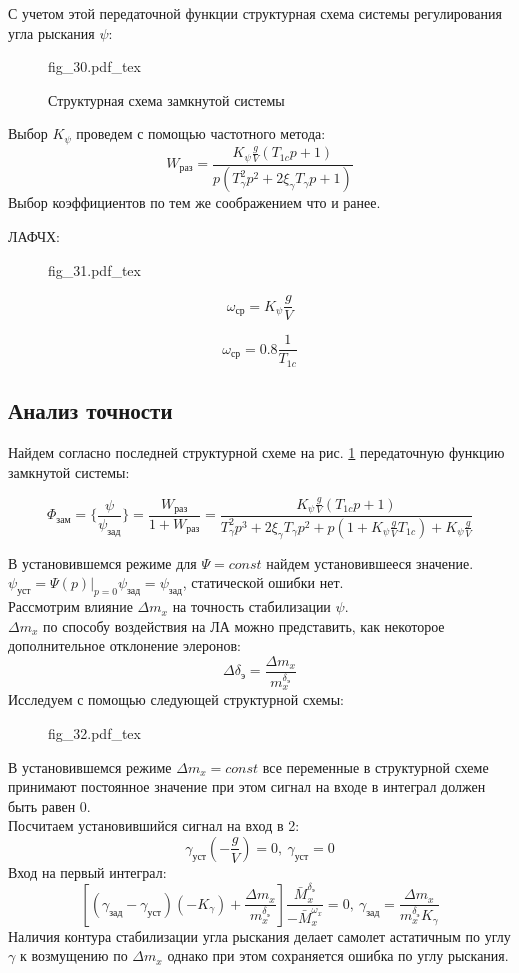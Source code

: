 \documentclass{article}
\begin{document}
С учетом этой передаточной функции структурная схема системы регулирования угла
рыскания $\psi$:

\begin{figure}[h]
    \centering
    {fig_30.pdf_tex}
    \caption{Структурная схема замкнутой системы}
    \label{fig:zam30}
\end{figure}

Выбор $K_{\psi}$ проведем с помощью частотного метода:
\[
    W_\text{раз} = \frac{K_{\psi} \frac{g}{V} (T_{1c}p + 1)}{p(T_{\gamma}^2 p^2
    + 2 \xi_\gamma T_\gamma p + 1)}
\]
Выбор коэффициентов по тем же соображением что и ранее.


ЛАФЧХ:
\begin{figure}[H]
    \centering
    {fig_31.pdf_tex}
\end{figure}

\[
    \omega_\text{ср} = K_{\psi}\frac{g}{V}
\]

\[
    \omega_\text{ср} = 0.8\frac{1}{T_{1c}}
\]

\subsection{Анализ точности}
Найдем согласно последней структурной схеме на рис. \ref{fig:zam30}
передаточную функцию замкнутой системы:

\[
    \Phi_\text{зам} = \{\frac{\psi}{\psi_\text{зад}} \} = \frac{W_\text{раз}}{1
    + W_\text{раз}} = \frac{K_{\psi}\frac{g}{V}(T_{1c}p + 1)}{T_{\gamma}^2 p^3
+ 2\xi_\gamma T_\gamma p^2 + p(1 + K_{\psi}\frac{g}{V} T_{1c}) +
K_{\psi}\frac{g}{V}}
\]

В установившемся режиме для $\Psi = const$ найдем установившееся значение.\\
$\psi_\text{уст} = \Psi(p) |_{p=0}  \psi _\text{зад}= \psi_\text{зад}$,
статической ошибки нет.\\
Рассмотрим влияние $\Delta m_x$ на точность стабилизации $\psi$.\\
$\Delta m_x$ по способу воздействия на ЛА можно представить, как некоторое
дополнительное отклонение элеронов:
\[
    \Delta \delta_\text{э} =\frac{\Delta m_x}{m_x^{\delta_\text{э}}}
\]
Исследуем с помощью следующей структурной схемы:
\begin{figure}[H]
    \centering
    {fig_32.pdf_tex}
\end{figure}


В установившемся режиме $\Delta m_x = const$ все переменные в структурной схеме
принимают постоянное значение при этом сигнал на входе в интеграл должен быть
равен 0.\\
Посчитаем установившийся сигнал на вход в 2:
\[
    \gamma_\text{уст}(-\frac{g}{V}) = 0,\ \gamma_\text{уст} = 0
\]
Вход на первый интеграл:
\[
    \left[(\gamma_\text{зад} - \gamma_\text{уст})(-K_\gamma)+\frac{\Delta
    m_x}{m_x^{\delta_\text{э}}}\right]\frac{\bar{M}_x^{\delta_\text{э}}}{-\bar{M}_x^{\omega_x}}=
    0,\ \gamma_\text{зад}=\frac{\Delta m_x}{m_x^{\delta_\text{э}}K_{\gamma}}
\]
Наличия контура стабилизации угла рыскания делает самолет астатичным по углу
$\gamma$ к возмущению по $\Delta m_x$ однако при этом сохраняется ошибка по
углу рыскания.
\end{document}
